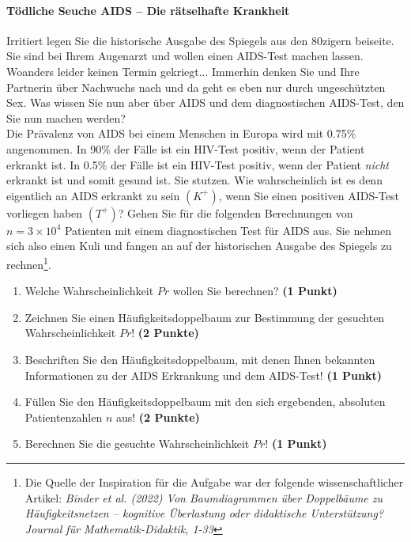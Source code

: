 \documentclass[a4paper, 9pt]{scrartcl}\usepackage[]{graphicx}\usepackage[]{xcolor}
\begin{document}
\paragraph{T{\"o}dliche Seuche AIDS -- Die r{\"a}tselhafte Krankheit}




Irritiert legen Sie die historische Ausgabe des Spiegels aus den 80zigern
beiseite. Sie sind bei Ihrem Augenarzt und wollen einen AIDS-Test machen
lassen. Woanders leider keinen Termin gekriegt... Immerhin denken Sie und
Ihre Partnerin {\"u}ber Nachwuchs nach und da geht es eben nur durch
ungesch{\"u}tzten Sex. Was wissen Sie nun aber {\"u}ber AIDS und dem diagnostischen
AIDS-Test, den Sie nun machen werden?\\

Die Pr{\"a}valenz von AIDS bei einem Menschen in Europa wird mit
0.75\% angenommen. In 90\% der F{\"a}lle ist ein
HIV-Test positiv, wenn der Patient erkrankt ist. In 0.5\%
der F{\"a}lle ist ein HIV-Test positiv, wenn der Patient \textit{nicht}
erkrankt ist und somit gesund ist. Sie stutzen. Wie wahrscheinlich ist es
denn eigentlich an AIDS erkrankt zu sein $(K^+)$, wenn Sie einen positiven
AIDS-Test vorliegen haben $(T^+)$? Gehen Sie f{\"u}r die folgenden Berechnungen
von $n = \ensuremath{3\times 10^{4}}$ Patienten mit einem diagnostischen Test f{\"u}r AIDS
aus. Sie nehmen sich also einen Kuli und fangen an auf der historischen
Ausgabe des Spiegels zu rechnen\footnote{Die Quelle der Inspiration f{\"u}r die
  Aufgabe war der folgende wissenschaftlicher Artikel: \textit{Binder et
    al. (2022) Von Baumdiagrammen {\"u}ber Doppelb{\"a}ume zu H{\"a}ufigkeitsnetzen --
    kognitive {\"U}berlastung oder didaktische Unterst{\"u}tzung? Journal f{\"u}r
    Mathematik-Didaktik, 1-33}}.

\begin{enumerate}
\item Welche Wahrscheinlichkeit $Pr$ wollen Sie berechnen? \textbf{(1 Punkt)}
\item Zeichnen Sie einen H{\"a}ufigkeitsdoppelbaum zur Bestimmung der gesuchten
  Wahrscheinlichkeit $Pr$! \textbf{(2 Punkte)} 
\item Beschriften Sie den H{\"a}ufigkeitsdoppelbaum, mit denen Ihnen bekannten
  Informationen zu der AIDS Erkrankung und dem AIDS-Test! \textbf{(1 Punkt)}
\item F{\"u}llen Sie den H{\"a}ufigkeitsdoppelbaum mit den sich ergebenden,
  absoluten Patientenzahlen $n$ aus! \textbf{(2 Punkte)}
\item Berechnen Sie die gesuchte Wahrscheinlichkeit $Pr$! \textbf{(1 Punkt)}
\end{enumerate}
\end{document}
